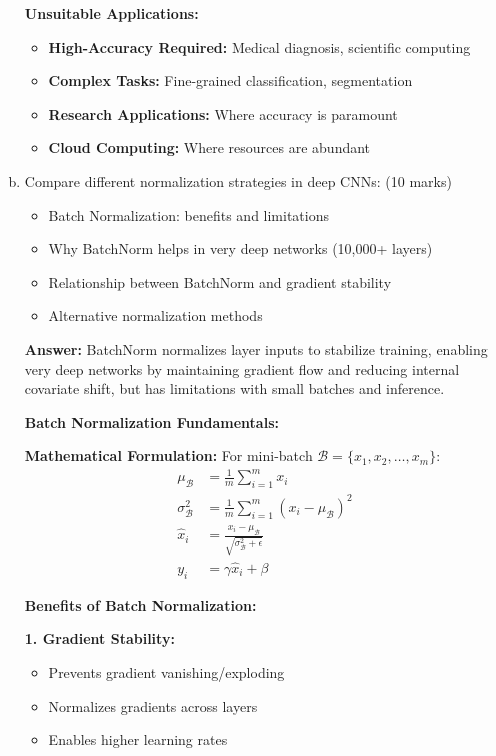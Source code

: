 \documentclass[12pt]{article}
\newcommand{\answer}[1]{{\color{answercolor}\textbf{Answer:} #1}}
\newcommand{\explanation}[1]{{\color{explanationcolor}#1}}
\begin{document}
\begin{enumerate}[(a)]
{    \textbf{Unsuitable Applications:}
    \begin{itemize}
        \item \textbf{High-Accuracy Required:} Medical diagnosis, scientific computing
        \item \textbf{Complex Tasks:} Fine-grained classification, segmentation
        \item \textbf{Research Applications:} Where accuracy is paramount
        \item \textbf{Cloud Computing:} Where resources are abundant
    \end{itemize}
    }
    
    \item Compare different normalization strategies in deep CNNs: \hfill (10 marks)
    \begin{itemize}
        \item Batch Normalization: benefits and limitations
        \item Why BatchNorm helps in very deep networks (10,000+ layers)
        \item Relationship between BatchNorm and gradient stability
        \item Alternative normalization methods
    \end{itemize}
    
    \answer{BatchNorm normalizes layer inputs to stabilize training, enabling very deep networks by maintaining gradient flow and reducing internal covariate shift, but has limitations with small batches and inference.}
    
    \explanation{
    \textbf{Batch Normalization Fundamentals:}
    
    \textbf{Mathematical Formulation:}
    For mini-batch $\mathcal{B} = \{x_1, x_2, \ldots, x_m\}$:
    \begin{align}
    \mu_{\mathcal{B}} &= \frac{1}{m} \sum_{i=1}^m x_i \\
    \sigma^2_{\mathcal{B}} &= \frac{1}{m} \sum_{i=1}^m (x_i - \mu_{\mathcal{B}})^2 \\
    \hat{x}_i &= \frac{x_i - \mu_{\mathcal{B}}}{\sqrt{\sigma^2_{\mathcal{B}} + \epsilon}} \\
    y_i &= \gamma \hat{x}_i + \beta
    \end{align}
    
    \textbf{Benefits of Batch Normalization:}
    
    \textbf{1. Gradient Stability:}
    \begin{itemize}
        \item Prevents gradient vanishing/exploding
        \item Normalizes gradients across layers
        \item Enables higher learning rates
    \end{itemize}
    
}
\end{enumerate}
\end{document}
